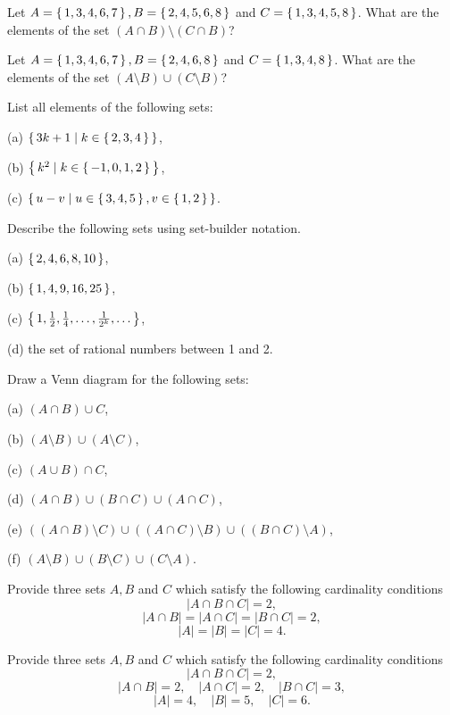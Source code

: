 \begin{exercise}\label{intro-ex-2}
Let $A=\left\{\,1,3,4,6,7\,\right\},B=\left\{\,2,4,5,6,8\,\right\}$ and $C=\left\{\,1,3,4,5,8\,\right\}$. 
What are the elements of the set $(A\cap B)\setminus(C\cap B)$?
\end{exercise}
\begin{exercise}\label{intro-ex-3}
Let $A=\left\{\,1,3,4,6,7\,\right\},B=\left\{\,2,4,6,8\,\right\}$ and $C=\left\{\,1,3,4,8\,\right\}$. 
What are the elements of the set $(A\setminus B)\cup(C\setminus B)$?
\end{exercise}
\begin{exercise}\label{intro-ex-4}
List all elements of the following sets:

(a) $\left\{\,3k+1\mid k\in\left\{\,2,3,4\,\right\}\,\right\}$,

(b) $\left\{\,k^2\mid  k\in\left\{\,-1,0,1,2\,\right\}\,\right\}$,

(c) $\left\{\,u-v\mid u\in\left\{\,3,4,5\,\right\}, v\in\left\{\,1,2\,\right\}\,\right\}$. 
\end{exercise}
\begin{exercise}\label{intro-ex-5}
Describe the following sets using set-builder notation.

(a) $\left\{\,2,4,6,8,10\,\right\}$,

(b) $\left\{\,1,4,9,16,25\,\right\}$,

(c) $\left\{\,1,\frac{1}{2},\frac{1}{4},\ldots, \frac{1}{2^k}, \ldots\,\right\}$,

(d) the set of rational numbers between 1 and 2.
\end{exercise}
\begin{exercise}\label{intro-ex-6}
Draw a Venn diagram for the following sets:

(a) $(A\cap B)\cup C$,

(b) $(A\setminus B)\cup(A\setminus C)$,

(c) $(A\cup B)\cap C$,

(d) $(A\cap B)\cup(B\cap C)\cup(A\cap C)$,

(e) $\left((A\cap B)\setminus C\right)\cup \left((A\cap C)\setminus B\right)\cup \left((B\cap C)\setminus A\right)$,

(f) $(A\setminus B)\cup(B\setminus C)\cup(C\setminus A)$.
\end{exercise}
\begin{exercise}\label{intro-ex-7}
Provide three sets $A,B$ and $C$ which satisfy the following cardinality conditions
$$
|A\cap B\cap C|=2,
$$
$$
|A\cap B|=|A\cap C|=|B\cap C|=2,
$$
$$
|A|=|B|=|C|=4.
$$
\end{exercise}
\begin{exercise}\label{intro-ex-8}
Provide three sets $A,B$ and $C$ which satisfy the following cardinality conditions
$$
|A\cap B\cap C|=2,
$$
$$
|A\cap B|=2,\quad |A\cap C|=2,\quad |B\cap C|=3,
$$
$$
|A|=4,\quad |B|=5,\quad |C|=6.
$$
\end{exercise}

